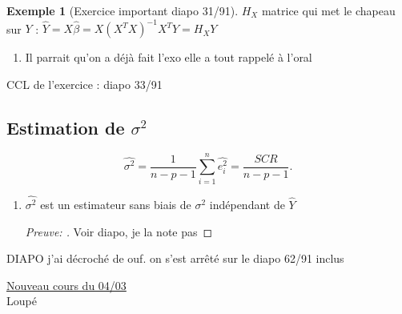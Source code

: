 \documentclass{article}
\theoremstyle{plain}%
\theoremstyle{definition}
\newtheorem{exmp}{Exemple}[section]
\theoremstyle{remark}
\begin{document}
\begin{exmp}[Exercice important diapo 31/91]
    $ H_X $ matrice qui met le chapeau sur $ Y $ : $ \hat{Y} = X \hat{\beta } = X (X^TX)^{-1} X^T Y = H_X Y $ 
    \begin{enumerate}
        \item Il parrait qu'on a déjà fait l'exo elle a tout rappelé à l'oral 
    \end{enumerate}
    CCL de l'exercice : diapo 33/91
\end{exmp}

\subsection{Estimation de $\sigma ^2$}

\[
    \hat{\sigma ^2} = \frac{1}{n-p-1}\sum_{i=1}^{n} \hat{e_i^2} = \frac{SCR}{n-p-1}
.\]
\begin{enumerate}
    \item $ \hat{\sigma ^2} $ est un estimateur sans biais de $ \sigma ^2 $ indépendant de $ \hat{Y} $ 
    \begin{proof}[Preuve: ]
        Voir diapo, je la note pas 
    \end{proof}
    
    
\end{enumerate}
DIAPO j'ai décroché de ouf. on s'est arrêté sur le diapo 62/91 inclus

\underline{Nouveau cours du 04/03} \\
Loupé
\end{document}
